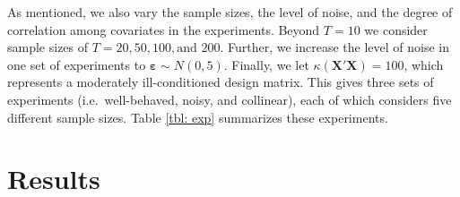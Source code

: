\documentclass{elsarticle}
\begin{document}
As mentioned, we also vary the sample sizes, the level of noise, and the degree of 
correlation among covariates in the experiments.
Beyond $T=10$ we consider sample sizes of $T=20, 50, 100, \text{and } 200$. 
Further, we increase the level of noise in one set of experiments to  
$\mathbf{\varepsilon} \sim N(0,5)$.
Finally, we let $\kappa(\mathbf{X}'\mathbf{X})=100$, which represents a moderately 
ill-conditioned design matrix.
This gives three sets of experiments (i.e.\ well-behaved, noisy, and collinear), each of
which considers five different sample sizes.
Table \ref{tbl: exp} summarizes these experiments.

\footnotesize
{}
\normalsize


\section{Results}
\label{sec: results}
\end{document}
